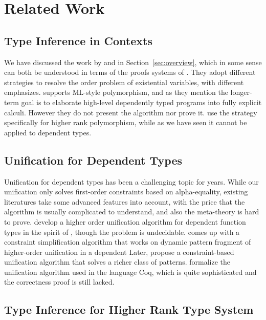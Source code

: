\section{Related Work}

\subsection{Type Inference in Contexts}

We have discussed the work by \citet{gundry2010type} and
\citet{dunfield2013complete} in Section~\ref{sec:overview}, which in some sense
can both be understood in terms of the proofs systems of
\citet{miller1992unification}. They adopt different strategies to resolve the
order problem of existential variables, with different emphasizes.
\citet{gundry2010type} supports ML-style polymorphism, and as they mention the
longer-term goal is to elaborate high-level dependently typed programs into
fully explicit calculi. However they do not present the algorithm nor prove it.
\citet{dunfield2013complete} use the strategy specifically for higher rank
polymorphism, while as we have seen it cannot be applied to dependent types.

\subsection{Unification for Dependent Types}

Unification for dependent types has been a challenging topic for years. While
our unification only solves first-order constraints based on alpha-equality,
existing literatures take some advanced features into account, with the price
that the algorithm is usually complicated to understand, and also the
meta-theory is hard to prove. \citet{elliott1989higher} develop a higher order
unification algorithm for dependent function types in the spirit of
\citet{huet1975unification}, though the problem is undecidable.
\citet{reed2009higher} comes up with a constraint simplification algorithm that
works on dynamic pattern fragment of higher-order unification in a dependent
Later, \citet{abel2011higher} propose a constraint-based unification algorithm
that solves a richer class of patterns.
\citet{ziliani2015unification} formalize the unification algorithm used in the
language Coq\citep{coqsite}, which is quite sophisticated and the correctness
proof is still lacked.

\subsection{Type Inference for Higher Rank Type System}

